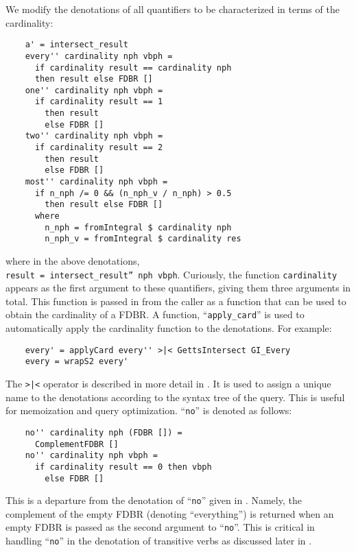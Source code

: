 \documentclass[../main.tex]{subfiles}
\begin{document}
\begin{refsection}
We modify the denotations of all quantifiers to be characterized in terms of the cardinality:
\begin{small}
\begin{verbatim}
    a' = intersect_result
    every'' cardinality nph vbph =
      if cardinality result == cardinality nph
      then result else FDBR []
    one'' cardinality nph vbph =
      if cardinality result == 1
        then result
        else FDBR []
    two'' cardinality nph vbph =
      if cardinality result == 2
        then result
        else FDBR []
    most'' cardinality nph vbph =
      if n_nph /= 0 && (n_nph_v / n_nph) > 0.5
        then result else FDBR []
      where
        n_nph = fromIntegral $ cardinality nph
        n_nph_v = fromIntegral $ cardinality res
\end{verbatim}
\end{small}
where in the above denotations, \\ \texttt{result = intersect\_result'' nph vbph}.
Curiously, the function \texttt{cardinality} appears as the first argument to these
quantifiers, giving them three arguments in total.  This function is passed in from the caller
as a function that can be used to obtain the cardinality of a FDBR.  A function, ``\texttt{apply\_card}'' is used to automatically apply the cardinality function to the denotations.  For example:
\begin{small}
	\begin{verbatim}
    every' = applyCard every'' >|< GettsIntersect GI_Every
    every = wrapS2 every'
	\end{verbatim}
\end{small}
The \texttt{>|<} operator is described in more detail in \cite{peelar2020webistjournal}.  It
is used to assign a unique name to the denotations according to the syntax tree of the query.
This is useful for memoization and query optimization.
``\texttt{no}'' is denoted as follows:
\begin{small}
	\begin{verbatim}
    no'' cardinality nph (FDBR []) =
      ComplementFDBR []
    no'' cardinality nph vbph =
      if cardinality result == 0 then vbph
        else FDBR []
	\end{verbatim}
\end{small}
This is a departure from the denotation of ``\texttt{no}'' given in \cite{frostboulos2002}.
Namely, the complement of the empty FDBR (denoting ``everything'') is returned when an empty
FDBR is passed as the second argument to ``\texttt{no}''.  This is critical in handling ``\texttt{no}'' in the denotation of transitive verbs as discussed later in .


\end{refsection}
\end{document}
